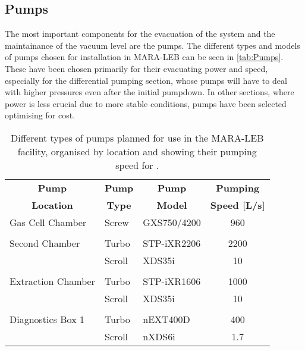 \subsection{Pumps}
\label{subsec:pumps}
The most important components for the evacuation of the system and the maintainance of the vacuum level are the pumps. The different types and models of pumps chosen for installation in MARA-LEB can be seen in \autoref{tab:Pumps}. These have been chosen primarily for their evacuating power and speed, especially for the differential pumping section, whose pumps will have to deal with higher pressures even after the initial pumpdown. In other sections, where power is less crucial due to more stable conditions, pumps have been selected optimising for cost.

\begin{table}[h!]
    \caption[MARA-LEB Pumps]{Different types of pumps planned for use in the MARA-LEB facility, organised by location and showing their pumping speed for .}
     \label{tab:Pumps}
    \centering
    \hspace*{-0.5em}
    \begin{tabular}{@{}lllc@{}}
    \hline
    \multicolumn{1}{c}{\textbf{Pump}} & \multicolumn{1}{c}{\textbf{Pump}}  & \multicolumn{1}{c}{\textbf{Pump}} & \multicolumn{1}{c}{\textbf{Pumping}} \\
    \multicolumn{1}{c}{\textbf{Location}} & \multicolumn{1}{c}{\textbf{Type}} & \multicolumn{1}{c}{\textbf{Model}} & {\textbf{Speed [L/s]}} \\
    \hline
    Gas Cell Chamber    & Screw     & GXS750/4200   & 960   \\ 
                                                            \\
    Second Chamber      & Turbo     & STP-iXR2206   & 2200  \\
                        & Scroll    & XDS35i        & 10    \\ 
                                                            \\
    Extraction Chamber  & Turbo     & STP-iXR1606   & 1000  \\
                        & Scroll    & XDS35i        & 10    \\
                                                            \\
    Diagnostics Box 1   & Turbo     & nEXT400D      & 400   \\
                        & Scroll    & nXDS6i        & 1.7   \\

\end{tabular}
\end{table}
